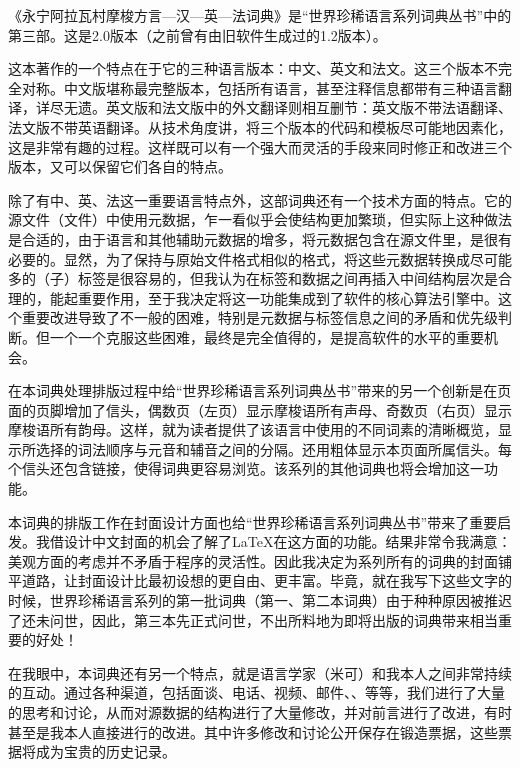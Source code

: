 《永宁阿拉瓦村摩梭方言—汉—英—法词典》是“世界珍稀语言系列词典丛书”中的第三部。这是2.0版本（之前曾有由旧软件生成过的1.2版本）。

这本著作的一个特点在于它的三种语言版本：中文、英文和法文。这三个版本不完全对称。中文版堪称最完整版本，包括所有语言，甚至注释信息都带有三种语言翻译，详尽无遗。英文版和法文版中的外文翻译则相互删节：英文版不带法语翻译、法文版不带英语翻译。从技术角度讲，将三个版本的代码和模板尽可能地因素化，这是非常有趣的过程。这样既可以有一个强大而灵活的手段来同时修正和改进三个版本，又可以保留它们各自的特点。

除了有中、英、法这一重要语言特点外，这部词典还有一个技术方面的特点。它的源文件（文件）中使用元数据，乍一看似乎会使结构更加繁琐，但实际上这种做法是合适的，由于语言和其他辅助元数据的增多，将元数据包含在源文件里，是很有必要的。显然，为了保持与原始文件格式相似的格式，将这些元数据转换成尽可能多的（子）标签是很容易的，但我认为在标签和数据之间再插入中间结构层次是合理的，能起重要作用，至于我决定将这一功能集成到了软件的核心算法引擎中。这个重要改进导致了不一般的困难，特别是元数据与标签信息之间的矛盾和优先级判断。但一个一个克服这些困难，最终是完全值得的，是提高软件的水平的重要机会。

在本词典处理排版过程中给“世界珍稀语言系列词典丛书”带来的另一个创新是在页面的页脚增加了信头，偶数页（左页）显示摩梭语所有声母、奇数页（右页）显示摩梭语所有韵母。这样，就为读者提供了该语言中使用的不同词素的清晰概览，显示所选择的词法顺序与元音和辅音之间的分隔。还用粗体显示本页面所属信头。每个信头还包含链接，使得词典更容易浏览。该系列的其他词典也将会增加这一功能。

本词典的排版工作在封面设计方面也给“世界珍稀语言系列词典丛书”带来了重要启发。我借设计中文封面的机会了解了\LaTeX{}在这方面的功能。结果非常令我满意：美观方面的考虑并不矛盾于程序的灵活性。因此我决定为系列所有的词典的封面铺平道路，让封面设计比最初设想的更自由、更丰富。毕竟，就在我写下这些文字的时候，世界珍稀语言系列的第一批词典（第一、第二本词典）由于种种原因被推迟了还未问世，因此，第三本先正式问世，不出所料地为即将出版的词典带来相当重要的好处！

在我眼中，本词典还有另一个特点，就是语言学家（米可）和我本人之间非常持续的互动。通过各种渠道，包括面谈、电话、视频、邮件、、等等，我们进行了大量的思考和讨论，从而对源数据的结构进行了大量修改，并对前言进行了改进，有时甚至是我本人直接进行的改进。其中许多修改和讨论公开保存在锻造票据，这些票据将成为宝贵的历史记录。

